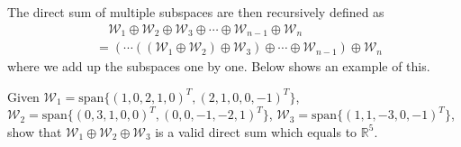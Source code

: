 The direct sum of multiple subspaces are then recursively defined as
\begin{align*}
&\quad \mathcal{W}_1 \oplus \mathcal{W}_2 \oplus \mathcal{W}_3 \oplus \cdots \oplus \mathcal{W}_{n-1} \oplus \mathcal{W}_n \\
&= (\cdots((\mathcal{W}_1 \oplus \mathcal{W}_2) \oplus \mathcal{W}_3) \oplus \cdots \oplus \mathcal{W}_{n-1}) \oplus \mathcal{W}_n
\end{align*}
where we add up the subspaces one by one. Below shows an example of this.
\begin{exmp}
\label{exmp:directsum}
Given $\mathcal{W}_1 = \text{span}\{(1,0,2,1,0)^T, (2,1,0,0,-1)^T\}$, $\mathcal{W}_2 = \text{span}\{(0,3,1,0,0)^T, (0,0,-1,-2,1)^T\}$, $\mathcal{W}_3 = \text{span}\{(1,1,-3,0,-1)^T\}$, show that $\mathcal{W}_1 \oplus \mathcal{W}_2 \oplus \mathcal{W}_3$ is a valid direct sum which equals to $\mathbb{R}^5$.
\end{exmp}
